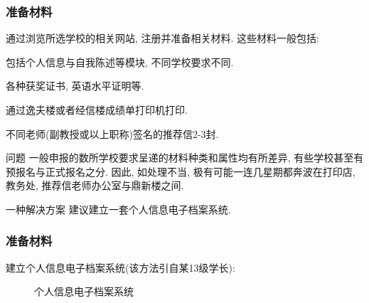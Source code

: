 \documentclass[Blue,dvipsnames]{beamer}
\begin{document}
    \begin{frame}
      \frametitle{准备材料}
        通过浏览所选学校的相关网站, 注册并准备相关材料. 这些材料一般包括:

        \begin{description}[leftmargin=!,labelwidth=\widthof{\bfseries 个人简历}]
          \small
          \item[个人简历] 包括个人信息与自我陈述等模块, 不同学校要求不同.
          \item[相关证书] 各种获奖证书, 英语水平证明等.
          \item[成绩单]   通过逸夫楼或者经信楼成绩单打印机打印. 
          \item[推荐信]   不同老师(副教授或以上职称)签名的推荐信2-3封.
        \end{description}

        \begin{alertblock}{问题}
          一般申报的数所学校要求呈递的材料种类和属性均有所差异, 有些学校甚至有预报名与正式报名之分. 因此, 如处理不当, 极有可能一连几星期都奔波在打印店, 教务处, 推荐信老师办公室与鼎新楼之间.
        \end{alertblock}

        \begin{block}{一种解决方案}
          建议建立一套个人信息电子档案系统.
        \end{block}
      \end{frame} 

    \begin{frame}
      \frametitle{准备材料}
        建立个人信息电子档案系统(该方法引自某13级学长):
        \begin{figure} 
          \caption{个人信息电子档案系统}
        \end{figure} 
      \end{frame} 
\end{document}

